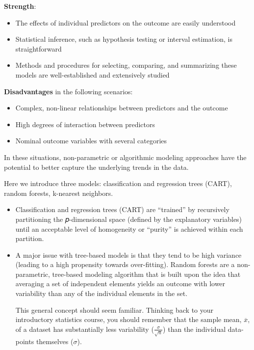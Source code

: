 \documentclass[
]{book}
\providecommand{\tightlist}{%
  \setlength{\itemsep}{0pt}\setlength{\parskip}{0pt}}
\begin{document}
\textbf{Strength}:

\begin{itemize}
\tightlist
\item
  The effects of individual predictors on the outcome are easily understood
\item
  Statistical inference, such as hypothesis testing or interval estimation, is straightforward
\item
  Methods and procedures for selecting, comparing, and summarizing these models are well-established and extensively studied
\end{itemize}

\textbf{Disadvantages} in the following scenarios:

\begin{itemize}
\tightlist
\item
  Complex, non-linear relationships between predictors and the outcome
\item
  High degrees of interaction between predictors
\item
  Nominal outcome variables with several categories
\end{itemize}

In these situations, non-parametric or algorithmic modeling approaches have the potential to better capture the underlying trends in the data.

Here we introduce three models: classification and regression trees (CART), random forests, k-nearest neighbors.

\begin{itemize}
\item
  Classification and regression trees (CART) are ``trained'' by recursively partitioning the 𝑝-dimensional space (defined by the explanatory variables) until an acceptable level of homogeneity or ``purity'' is achieved within each partition.
\item
  A major issue with tree-based models is that they tend to be high variance (leading to a high propensity towards over-fitting). Random forests are a non-parametric, tree-based modeling algorithm that is built upon the idea that averaging a set of independent elements yields an outcome with lower variability than any of the individual elements in the set.

  This general concept should seem familiar. Thinking back to your introductory statistics course, you should remember that the sample mean, \(\overline{x}\), of a dataset has substantially less variability (\(\frac{\sigma}{\sqrt{n}}\)) than the individual data-points themselves (\(\sigma\)).
\end{itemize}
\end{document}
